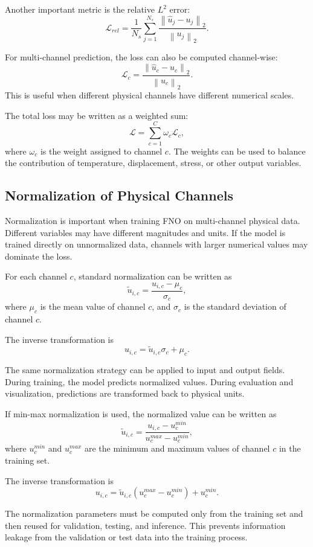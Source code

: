 \documentclass[14pt]{extarticle}
\begin{document}
Another important metric is the relative \(L^2\) error:
\[
\mathcal{L}_{rel}
=
\frac{1}{N_s}
\sum_{j=1}^{N_s}
\frac{
\left\|
\hat{u}_j - u_j
\right\|_2
}{
\left\|
u_j
\right\|_2
}.
\]

For multi-channel prediction, the loss can also be computed channel-wise:
\[
\mathcal{L}_{c}
=
\frac{
\left\|
\hat{u}_{c} - u_{c}
\right\|_2
}{
\left\|
u_{c}
\right\|_2
}.
\]
This is useful when different physical channels have different numerical scales.

The total loss may be written as a weighted sum:
\[
\mathcal{L}
=
\sum_{c=1}^{C}
\omega_c
\mathcal{L}_c,
\]
where \(\omega_c\) is the weight assigned to channel \(c\). The weights can be used to balance the contribution of temperature, displacement, stress, or other output variables.

\subsection{Normalization of Physical Channels}

Normalization is important when training FNO on multi-channel physical data. Different variables may have different magnitudes and units. If the model is trained directly on unnormalized data, channels with larger numerical values may dominate the loss.

For each channel \(c\), standard normalization can be written as
\[
\tilde{u}_{i,c}
=
\frac{
u_{i,c} - \mu_c
}{
\sigma_c
},
\]
where \(\mu_c\) is the mean value of channel \(c\), and \(\sigma_c\) is the standard deviation of channel \(c\).

The inverse transformation is
\[
u_{i,c}
=
\tilde{u}_{i,c}\sigma_c + \mu_c.
\]

The same normalization strategy can be applied to input and output fields. During training, the model predicts normalized values. During evaluation and visualization, predictions are transformed back to physical units.

If min-max normalization is used, the normalized value can be written as
\[
\tilde{u}_{i,c}
=
\frac{
u_{i,c} - u_{c}^{min}
}{
u_{c}^{max} - u_{c}^{min}
},
\]
where \(u_{c}^{min}\) and \(u_{c}^{max}\) are the minimum and maximum values of channel \(c\) in the training set.

The inverse transformation is
\[
u_{i,c}
=
\tilde{u}_{i,c}
\left(
u_{c}^{max} - u_{c}^{min}
\right)
+
u_{c}^{min}.
\]

The normalization parameters must be computed only from the training set and then reused for validation, testing, and inference. This prevents information leakage from the validation or test data into the training process.
\end{document}

